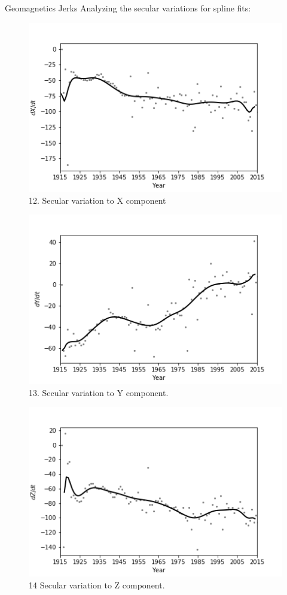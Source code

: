 \documentclass[final,t]{beamer}
\begin{document}
\begin{columns}[t]
\begin{column}{.66\linewidth}
\begin{columns}
\begin{column}{.31\linewidth}
\begin{block}{Geomagnetics Jerks}
Analyzing the secular variations for spline fits: 		
		\begin{figure}
			\centering
			\includegraphics[width=0.7\linewidth]{spline101sv_X_spline}
			\caption{12. Secular variation to X component}
			\label{SPLINEx}
		\end{figure}
		
		\begin{figure}
			\centering
			\includegraphics[width=0.7\linewidth]{spline100sv_y_spline}
			\caption{13. Secular variation to Y component.}
			\label{SPLINEy}
		\end{figure}
		
		\begin{figure}
			\centering
			\includegraphics[width=0.7\linewidth]{spline100sv_z_spline}
			\caption{14 Secular variation to Z component.}
			\label{Splinez}
		\end{figure}
		

\end{block}
\end{column}
\end{columns}
\end{column}
\end{columns}
\end{document}
